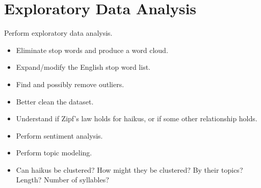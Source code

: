 \section{Exploratory Data Analysis}\label{sec:explore}

{\color{red}
    Perform exploratory data analysis.

    \begin{itemize}
        \item Eliminate stop words and produce a word cloud.
        \item Expand/modify the English stop word list.
        \item Find and possibly remove outliers.
        \item Better clean the dataset.
        \item Understand if Zipf's law holds for haikus, or if some other relationship holds.
        \item Perform sentiment analysis.
        \item Perform topic modeling.
        \item Can haikus be clustered? How might they be clustered? By their topics? Length? Number
              of syllables?
    \end{itemize}
}
